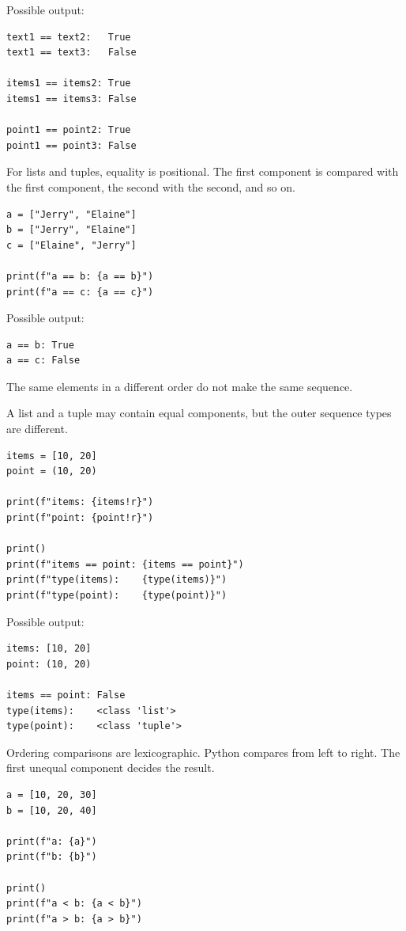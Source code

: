 Possible output:

\begin{verbatim}
text1 == text2:   True
text1 == text3:   False

items1 == items2: True
items1 == items3: False

point1 == point2: True
point1 == point3: False
\end{verbatim}

For lists and tuples, equality is positional. The first component is compared with the first component, the second with the second, and so on.

\begin{verbatim}
a = ["Jerry", "Elaine"]
b = ["Jerry", "Elaine"]
c = ["Elaine", "Jerry"]

print(f"a == b: {a == b}")
print(f"a == c: {a == c}")
\end{verbatim}

Possible output:

\begin{verbatim}
a == b: True
a == c: False
\end{verbatim}

The same elements in a different order do not make the same sequence.

A list and a tuple may contain equal components, but the outer sequence types are different.

\begin{verbatim}
items = [10, 20]
point = (10, 20)

print(f"items: {items!r}")
print(f"point: {point!r}")

print()
print(f"items == point: {items == point}")
print(f"type(items):    {type(items)}")
print(f"type(point):    {type(point)}")
\end{verbatim}

Possible output:

\begin{verbatim}
items: [10, 20]
point: (10, 20)

items == point: False
type(items):    <class 'list'>
type(point):    <class 'tuple'>
\end{verbatim}

Ordering comparisons are lexicographic. Python compares from left to right. The first unequal component decides the result.

\begin{verbatim}
a = [10, 20, 30]
b = [10, 20, 40]

print(f"a: {a}")
print(f"b: {b}")

print()
print(f"a < b: {a < b}")
print(f"a > b: {a > b}")
\end{verbatim}

